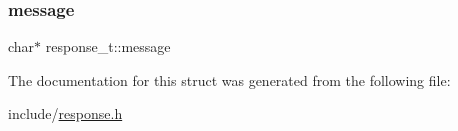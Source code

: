 \mbox{\label{structresponse__t_a9667b0741537bcef38ec1616119302bf}} 
\subsubsection{\texorpdfstring{message}{message}}
{\footnotesize\ttfamily char$\ast$ response\+\_\+t\+::message}



The documentation for this struct was generated from the following file\+:\begin{DoxyCompactItemize}
\item 
include/\mbox{\hyperlink{response_8h}{response.\+h}}\end{DoxyCompactItemize}
